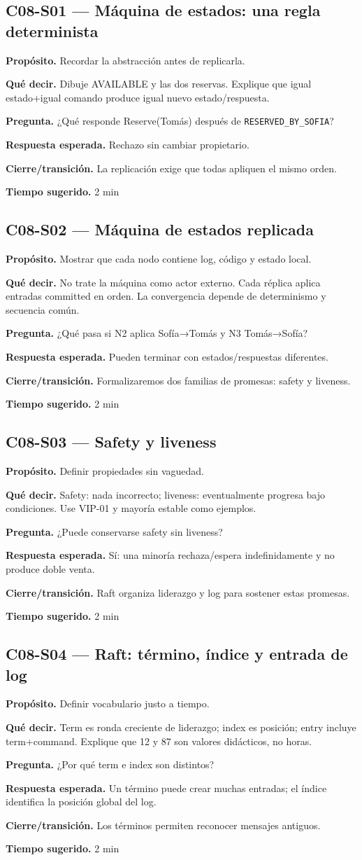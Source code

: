 \documentclass[variant=docente,cover=institutional,mode=screen]{ua-engineering-v6-article}
\newcommand{\FrameField}[2]{\par\noindent\textbf{#1.} #2\par}
\begin{document}
\subsection*{C08-S01 --- Máquina de estados: una regla determinista}
\FrameField{Propósito}{Recordar la abstracción antes de replicarla.}
\FrameField{Qué decir}{Dibuje AVAILABLE y las dos reservas. Explique que igual estado+igual comando produce igual nuevo estado/respuesta.}
\FrameField{Pregunta}{¿Qué responde Reserve(Tomás) después de \texttt{RESERVED\_BY\_SOFIA}?}
\FrameField{Respuesta esperada}{Rechazo sin cambiar propietario.}
\FrameField{Cierre/transición}{La replicación exige que todas apliquen el mismo orden.}
\FrameField{Tiempo sugerido}{2 min}

\subsection*{C08-S02 --- Máquina de estados replicada}
\FrameField{Propósito}{Mostrar que cada nodo contiene log, código y estado local.}
\FrameField{Qué decir}{No trate la máquina como actor externo. Cada réplica aplica entradas committed en orden. La convergencia depende de determinismo y secuencia común.}
\FrameField{Pregunta}{¿Qué pasa si N2 aplica Sofía→Tomás y N3 Tomás→Sofía?}
\FrameField{Respuesta esperada}{Pueden terminar con estados/respuestas diferentes.}
\FrameField{Cierre/transición}{Formalizaremos dos familias de promesas: safety y liveness.}
\FrameField{Tiempo sugerido}{2 min}

\subsection*{C08-S03 --- Safety y liveness}
\FrameField{Propósito}{Definir propiedades sin vaguedad.}
\FrameField{Qué decir}{Safety: nada incorrecto; liveness: eventualmente progresa bajo condiciones. Use VIP-01 y mayoría estable como ejemplos.}
\FrameField{Pregunta}{¿Puede conservarse safety sin liveness?}
\FrameField{Respuesta esperada}{Sí: una minoría rechaza/espera indefinidamente y no produce doble venta.}
\FrameField{Cierre/transición}{Raft organiza liderazgo y log para sostener estas promesas.}
\FrameField{Tiempo sugerido}{2 min}

\subsection*{C08-S04 --- Raft: término, índice y entrada de log}
\FrameField{Propósito}{Definir vocabulario justo a tiempo.}
\FrameField{Qué decir}{Term es ronda creciente de liderazgo; index es posición; entry incluye term+command. Explique que 12 y 87 son valores didácticos, no horas.}
\FrameField{Pregunta}{¿Por qué term e index son distintos?}
\FrameField{Respuesta esperada}{Un término puede crear muchas entradas; el índice identifica la posición global del log.}
\FrameField{Cierre/transición}{Los términos permiten reconocer mensajes antiguos.}
\FrameField{Tiempo sugerido}{2 min}
\end{document}
